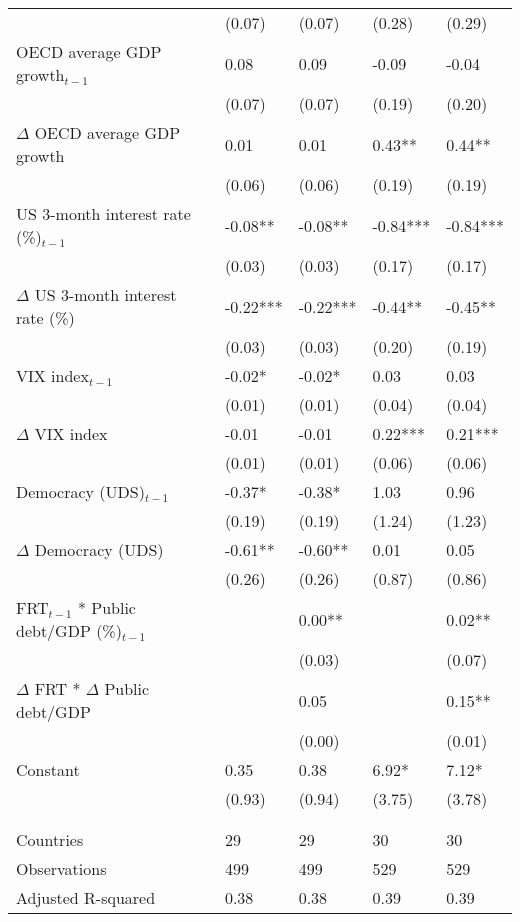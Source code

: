 \begin{tabular}{lp{3cm}p{3cm}p{3cm}p{3cm}}
   & (0.07) & (0.07) & (0.28) & (0.29) \\ 
  OECD average GDP growth$_{t-1}$ & 0.08 & 0.09 & -0.09 & -0.04 \\ 
   & (0.07) & (0.07) & (0.19) & (0.20) \\ 
  $\Delta$ OECD average GDP growth & 0.01 & 0.01 & 0.43** & 0.44** \\ 
   & (0.06) & (0.06) & (0.19) & (0.19) \\ 
  US 3-month interest rate (\%)$_{t-1}$ & -0.08** & -0.08** & -0.84*** & -0.84*** \\ 
   & (0.03) & (0.03) & (0.17) & (0.17) \\ 
  $\Delta$ US 3-month interest rate (\%) & -0.22*** & -0.22*** & -0.44** & -0.45** \\ 
   & (0.03) & (0.03) & (0.20) & (0.19) \\ 
  VIX index$_{t-1}$ & -0.02* & -0.02* & 0.03 & 0.03 \\ 
   & (0.01) & (0.01) & (0.04) & (0.04) \\ 
  $\Delta$ VIX index & -0.01 & -0.01 & 0.22*** & 0.21*** \\ 
   & (0.01) & (0.01) & (0.06) & (0.06) \\ 
  Democracy (UDS)$_{t-1}$ & -0.37* & -0.38* & 1.03 & 0.96 \\ 
   & (0.19) & (0.19) & (1.24) & (1.23) \\ 
  $\Delta$ Democracy (UDS) & -0.61** & -0.60** & 0.01 & 0.05 \\ 
   & (0.26) & (0.26) & (0.87) & (0.86) \\ 
  FRT$_{t-1}$ * Public debt/GDP (\%)$_{t-1}$ &  & 0.00** &  & 0.02** \\ 
   &  & (0.03) &  & (0.07) \\ 
  $\Delta$ FRT * $\Delta$ Public debt/GDP &  & 0.05 &  & 0.15** \\ 
   &  & (0.00) &  & (0.01) \\ 
  Constant & 0.35 & 0.38 & 6.92* & 7.12* \\ 
   & (0.93) & (0.94) & (3.75) & (3.78) \\ 
   &  &  &  &  \\ 
   &  &  &  &  \\ 
  Countries & 29 & 29 & 30 & 30 \\ 
  Observations & 499 & 499 & 529 & 529 \\ 
  Adjusted R-squared & 0.38 & 0.38 & 0.39 & 0.39 \\ 
   \hline
\end{tabular}
\endgroup
